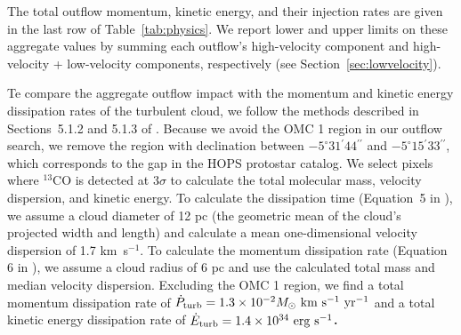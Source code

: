 \documentclass[twocolumn]{aastex63}
\newcommand{\co}[1][]{\ensuremath{^{#1}}CO}
\begin{document}
The total outflow momentum, kinetic energy, and their injection rates are given in the last row of Table~\ref{tab:physics}. We report lower and upper limits on these aggregate values by summing each outflow's high-velocity component and high-velocity + low-velocity components, respectively (see Section~\ref{sec:lowvelocity}). 

Te compare the aggregate outflow impact with the momentum and kinetic energy dissipation rates of the turbulent cloud, we follow the methods described in Sections~5.1.2 and 5.1.3 of \citet{Feddersen18}. Because we avoid the OMC 1 region in our outflow search, we remove the region with declination between $-5^\circ31{}^\prime44{}^{\prime\prime}$ and $-5^\circ15{}^\prime33{}^{\prime\prime}$, which corresponds to the gap in the HOPS protostar catalog. We select pixels where \co[13] is detected at 3$\sigma$ to calculate the total molecular mass, velocity dispersion, and kinetic energy. To calculate the dissipation time (Equation~5 in \citealp{Feddersen18}), we assume a cloud diameter of 12 pc (the geometric mean of the cloud's projected width and length) and calculate a mean one-dimensional velocity dispersion of 1.7 km~s$^{-1}$. To calculate the momentum dissipation rate (Equation 6 in \citealp{Feddersen18}), we assume a cloud radius of 6 pc and use the calculated total mass and median velocity dispersion. Excluding the OMC 1 region, we find a total momentum dissipation rate of \textbf{$\dot P_{\rm turb} = 1.3\times10^{-2}M_\odot~\rm{km}~\rm{s}^{-1}~\rm{yr}^{-1}$} and a total kinetic energy dissipation rate of \textbf{$\dot E_{\rm turb} = 1.4\times10^{34}~\rm{erg}~\rm{s}^{-1}$.}


\end{document}
